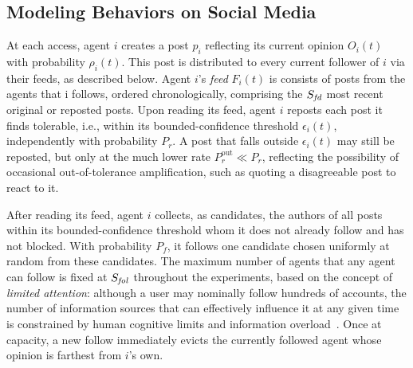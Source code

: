 \documentclass{svproc}
\def\post{\rho}                 %
\def\BoundedConfidence{\epsilon} %
\def\feed{F}                    %
\def\maxfollower{S_{\it fol}}    %
\def\maxfeed{S_{\it fd}}         %
\begin{document}
\subsection{Modeling Behaviors on Social Media}\label{sec:model-behaviors}
At each access, agent $i$ creates a post $p_i$ reflecting its current
opinion $O_i(t)$ with probability $\post_i(t)$. This post is distributed 
to every current follower of $i$ via their
feeds, as described below.
Agent $i$'s {\em feed} $\feed_i(t)$ is 
consists of posts from the agents 
that i follows, ordered chronologically, 
comprising the $\maxfeed$ most recent original or reposted posts.
Upon reading its feed, agent $i$ reposts each post it finds tolerable,
i.e., within its bounded-confidence threshold
$\BoundedConfidence_i(t)$, independently with probability $P_r$. A
post that falls outside $\BoundedConfidence_i(t)$ may still be
reposted, but only at the much lower rate $P_r^{\text{out}}\ll P_r$,
reflecting the possibility of occasional out-of-tolerance
amplification, such as quoting a disagreeable post to react to it.
\par


After reading its feed, agent $i$ collects, as candidates, the authors
of all posts within its bounded-confidence threshold whom it does not
already follow and has not blocked. With probability $P_f$, it follows
one candidate chosen uniformly at random from these candidates. The
maximum number of agents that any agent can follow is fixed at
$\maxfollower$ throughout the experiments, based on the concept of
\emph{limited attention}: although a user may nominally follow
hundreds of accounts, the number of information sources that can
effectively influence it at any given time is constrained by human
cognitive limits and information
overload~\cite{goncalves2011,weng2012}. Once at capacity, a new follow
immediately evicts the currently followed agent whose opinion is
farthest from $i$'s own.
\par
\end{document}
